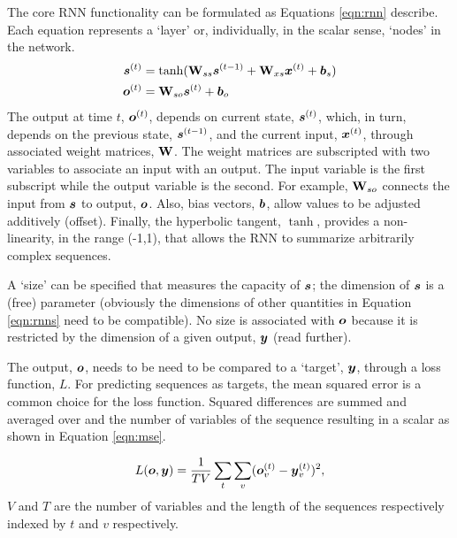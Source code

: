 The core RNN functionality can be formulated as Equations \ref{eqn:rnn} describe. Each equation represents a `layer' or, individually, in the scalar sense, `nodes' in the network.
\begin{subequations}  
  \label{eqn:rnn}
  \begin{align}
    \boldsymbol{s}\sp{(t)}&=
              \mathrm{\tanh}(
              \mathbf{W}_{ss}
              \boldsymbol{s}\sp{(t-1)}
              +
              \mathbf{W}_{xs}
              \boldsymbol{x}\sp{(t)}
              +
              \boldsymbol{b}_s
              ) 
              \label{eqn:rnns} \\ 
    \boldsymbol{o}\sp{(t)}&=
             \mathbf{W}_{so}
             \boldsymbol{s}\sp{(t)}
             +
             \boldsymbol{b}_{o}
             \label{eqn:rnno}
  \end{align}
\end{subequations}
\noindent 
The output at time $t$, $\boldsymbol{o}\sp{(t)}$, depends on current state, $\boldsymbol{s}\sp{(t)}$, which, in turn, depends on the previous state, $\boldsymbol{s}\sp{(t-1)}$, and the current input, $\boldsymbol{x}\sp{(t)}$, through associated weight matrices, $\mathbf{W}$. The weight matrices are subscripted with two variables to associate an input with an output. The input variable is the first subscript while the output variable is the second. For example, $\mathbf{W}_{so}$ connects the input from $\boldsymbol{s}$ to output, $\boldsymbol{o}$. Also, bias vectors, $\boldsymbol{b}$, allow values to be adjusted additively (offset). Finally, the hyperbolic tangent, $\tanh$, provides a non-linearity, in the range (-1,1), that allows the RNN to summarize arbitrarily complex sequences.

A `size' can be specified that measures the capacity of $\boldsymbol{s}$; the dimension of $\boldsymbol{s}$ is a (free) parameter (obviously the dimensions of other quantities in Equation \ref{eqn:rnns} need to be compatible).
%
No size is associated with $\boldsymbol{o}$ because it is restricted by the dimension of a given output, $\boldsymbol{y}$ (read further).

The output, $\boldsymbol{o}$, needs to be need to be compared to a `target', $\boldsymbol{y}$, through a loss function, $L$. For predicting sequences as targets, the mean squared error is a common choice for the loss function. Squared differences are summed and averaged over and the number of variables of the sequence resulting in a scalar as shown in Equation \ref{eqn:mse}.

\begin{equation}
  \label{eqn:mse}
  L(\boldsymbol{o},\boldsymbol{y}) = \frac{1}{TV} \sum_t \sum_v(
  \boldsymbol{o}\sp{(t)}_v - \boldsymbol{y}\sp{(t)}_v
  )^2,
\end{equation}
\noindent
$V$ and $T$ are the number of variables and the length of the sequences respectively indexed by $t$ and $v$ respectively.

